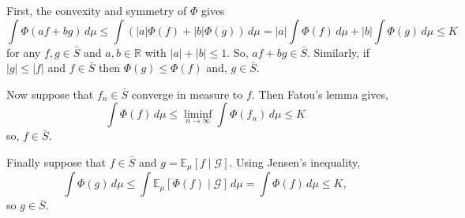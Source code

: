 \documentclass[12pt]{article}
\begin{document}
First, the convexity and symmetry of $\Phi$ gives
\begin{equation*}
\int\Phi(a f+b g)\,d\mu \le \int\left(|a|\Phi(f)+|b|\Phi(g)\right)\,d\mu
=|a|\int\Phi(f)\,d\mu+|b|\int\Phi(g)\,d\mu\le K
\end{equation*}
for any $f,g\in\bar{S}$ and $a,b\in\mathbb{R}$ with $|a|+|b|\le 1$. So, $af+bg\in\bar{S}$.
Similarly, if $|g|\le |f|$ and $f\in\bar{S}$ then $\Phi(g)\le\Phi(f)$ and, $g\in\bar{S}$.

Now suppose that $f_n\in\bar{S}$ converge in measure to $f$. Then Fatou's lemma gives,
\begin{equation*}
\int\Phi(f)\,d\mu\le\liminf_{n\rightarrow\infty}\int\Phi(f_n)\,d\mu\le K
\end{equation*}
so, $f\in\bar S$.

Finally suppose that $f\in\bar S$ and $g=\mathbb{E}_\mu[f\mid\mathcal{G}]$. Using Jensen's inequality,
\begin{equation*}
\int \Phi(g)\,d\mu\le \int \mathbb{E}_\mu[\Phi(f)\mid\mathcal{G}]\,d\mu=\int\Phi(f)\,d\mu\le K,
\end{equation*}
so $g\in\bar S$.

\end{document}

